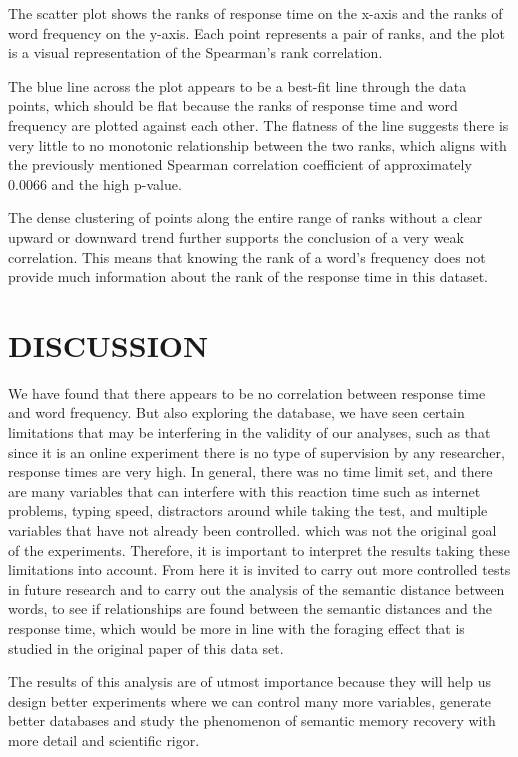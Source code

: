 \documentclass[
]{article}
\begin{document}
The scatter plot shows the ranks of response time on the x-axis and the
ranks of word frequency on the y-axis. Each point represents a pair of
ranks, and the plot is a visual representation of the Spearman's rank
correlation.

The blue line across the plot appears to be a best-fit line through the
data points, which should be flat because the ranks of response time and
word frequency are plotted against each other. The flatness of the line
suggests there is very little to no monotonic relationship between the
two ranks, which aligns with the previously mentioned Spearman
correlation coefficient of approximately 0.0066 and the high p-value.

The dense clustering of points along the entire range of ranks without a
clear upward or downward trend further supports the conclusion of a very
weak correlation. This means that knowing the rank of a word's frequency
does not provide much information about the rank of the response time in
this dataset.

\hypertarget{discussion}{%
\section{DISCUSSION}\label{discussion}}

We have found that there appears to be no correlation between response
time and word frequency. But also exploring the database, we have seen
certain limitations that may be interfering in the validity of our
analyses, such as that since it is an online experiment there is no type
of supervision by any researcher, response times are very high. In
general, there was no time limit set, and there are many variables that
can interfere with this reaction time such as internet problems, typing
speed, distractors around while taking the test, and multiple variables
that have not already been controlled. which was not the original goal
of the experiments. Therefore, it is important to interpret the results
taking these limitations into account. From here it is invited to carry
out more controlled tests in future research and to carry out the
analysis of the semantic distance between words, to see if relationships
are found between the semantic distances and the response time, which
would be more in line with the foraging effect that is studied in the
original paper of this data set.

The results of this analysis are of utmost importance because they will
help us design better experiments where we can control many more
variables, generate better databases and study the phenomenon of
semantic memory recovery with more detail and scientific rigor.
\end{document}
